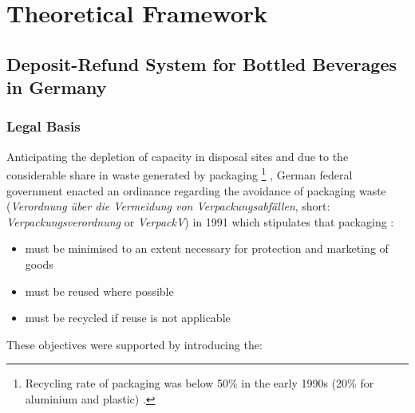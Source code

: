 
\chapter{Theoretical Framework}
\label{chp:theoreticalFramework}

\section{Deposit-Refund System for Bottled Beverages in Germany}
\subsection{Legal Basis}
\label{sec:legalBasis}
Anticipating the depletion of capacity in disposal sites and due to the considerable share in waste generated by packaging \footnote{Recycling rate of packaging was below 50\% in the early 1990s (20\% for aluminium and plastic) \cite{GVM2010}.} \cite{Hartlep2011Recycling}, German federal government enacted an ordinance regarding the avoidance of packaging waste (\textit{Verordnung über die Vermeidung von Verpackungsabfällen}, short: \textit{Verpackungsverordnung} or \textit{VerpackV}) in 1991 which stipulates that packaging \cite[§~1]{verpackV1991}:

\begin{itemize}
  \item must be minimised to an extent necessary for protection and marketing of goods
  \item must be reused where possible
  \item must be recycled if reuse is not applicable 
\end{itemize}

These objectives were supported by introducing the:


